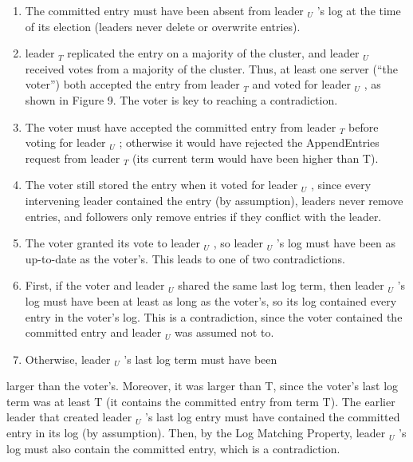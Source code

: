 \documentclass[
]{article}
\providecommand{\tightlist}{%
  \setlength{\itemsep}{0pt}\setlength{\parskip}{0pt}}
\begin{document}
\begin{enumerate}
\def\labelenumi{\arabic{enumi}.}
\tightlist
\item
  The committed entry must have been absent from leader \(_{U}\) 's log
  at the time of its election (leaders never delete or overwrite
  entries).\\
\item
  leader \(_{T}\) replicated the entry on a majority of the cluster, and
  leader \(_{U}\) received votes from a majority of the cluster. Thus,
  at least one server (``the voter'') both accepted the entry from
  leader \(_{T}\) and voted for leader \(_{U}\) , as shown in Figure 9.
  The voter is key to reaching a contradiction.\\
\item
  The voter must have accepted the committed entry from leader \(_{T}\)
  before voting for leader \(_{U}\) ; otherwise it would have rejected
  the AppendEntries request from leader \(_{T}\) (its current term would
  have been higher than T).\\
\item
  The voter still stored the entry when it voted for leader \(_{U}\) ,
  since every intervening leader contained the entry (by assumption),
  leaders never remove entries, and followers only remove entries if
  they conflict with the leader.\\
\item
  The voter granted its vote to leader \(_{U}\) , so leader \(_{U}\) 's
  log must have been as up-to-date as the voter's. This leads to one of
  two contradictions.\\
\item
  First, if the voter and leader \(_{U}\) shared the same last log term,
  then leader \(_{U}\) 's log must have been at least as long as the
  voter's, so its log contained every entry in the voter's log. This is
  a contradiction, since the voter contained the committed entry and
  leader \(_{U}\) was assumed not to.\\
\item
  Otherwise, leader \(_{U}\) 's last log term must have been
\end{enumerate}

larger than the voter's. Moreover, it was larger than T, since the
voter's last log term was at least T (it contains the committed entry
from term T). The earlier leader that created leader \(_{U}\) 's last
log entry must have contained the committed entry in its log (by
assumption). Then, by the Log Matching Property, leader \(_{U}\) 's log
must also contain the committed entry, which is a contradiction.
\end{document}
